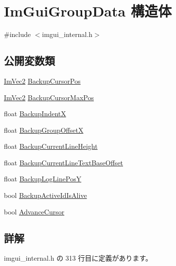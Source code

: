 \hypertarget{struct_im_gui_group_data}{}\section{Im\+Gui\+Group\+Data 構造体}
\label{struct_im_gui_group_data}


{\ttfamily \#include $<$imgui\+\_\+internal.\+h$>$}

\subsection*{公開変数類}
\begin{DoxyCompactItemize}
\item 
\mbox{\hyperlink{struct_im_vec2}{Im\+Vec2}} \mbox{\hyperlink{struct_im_gui_group_data_a8b29e2d9081876fd4847b1cd86c60500}{Backup\+Cursor\+Pos}}
\item 
\mbox{\hyperlink{struct_im_vec2}{Im\+Vec2}} \mbox{\hyperlink{struct_im_gui_group_data_abb83c4db050ef7d20485902cc14c4a0d}{Backup\+Cursor\+Max\+Pos}}
\item 
float \mbox{\hyperlink{struct_im_gui_group_data_a9d39092c1c154ba4809ae79e47baeb64}{Backup\+IndentX}}
\item 
float \mbox{\hyperlink{struct_im_gui_group_data_a0cee1b14b574a4bf883ceb1be58a9332}{Backup\+Group\+OffsetX}}
\item 
float \mbox{\hyperlink{struct_im_gui_group_data_a6e17deccf50138bdf436fa172bb453e2}{Backup\+Current\+Line\+Height}}
\item 
float \mbox{\hyperlink{struct_im_gui_group_data_a3745219bd1f4c6ee5080d8d0aaa8a712}{Backup\+Current\+Line\+Text\+Base\+Offset}}
\item 
float \mbox{\hyperlink{struct_im_gui_group_data_af67f52c70f74a3b7bce8ce46affc856b}{Backup\+Log\+Line\+PosY}}
\item 
bool \mbox{\hyperlink{struct_im_gui_group_data_ac27968bcfd94ba2e4b1543b95d032f35}{Backup\+Active\+Id\+Is\+Alive}}
\item 
bool \mbox{\hyperlink{struct_im_gui_group_data_a2bfc0ee6236ec2ace16634a34eda72d7}{Advance\+Cursor}}
\end{DoxyCompactItemize}


\subsection{詳解}


 imgui\+\_\+internal.\+h の 313 行目に定義があります。



